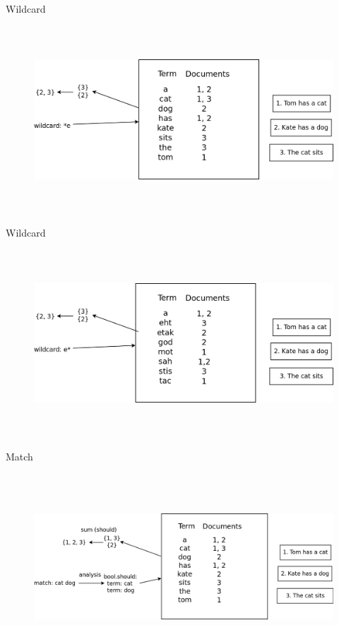 \documentclass{beamer}
\begin{document}
\begin{frame}{Wildcard}
	\begin{figure}
		\includegraphics[width=\textwidth,height=7cm,keepaspectratio=true]{wildcard-suffix}
	\end{figure}
\end{frame}
\begin{frame}{Wildcard}
	\begin{figure}
		\includegraphics[width=\textwidth,height=7cm,keepaspectratio=true]{wildcard-suffix-prefix}
	\end{figure}
\end{frame}
\begin{frame}{Match}
	\begin{figure}
		\includegraphics[width=\textwidth,height=7cm,keepaspectratio=true]{match-query}
	\end{figure}
\end{frame}
\end{document}
